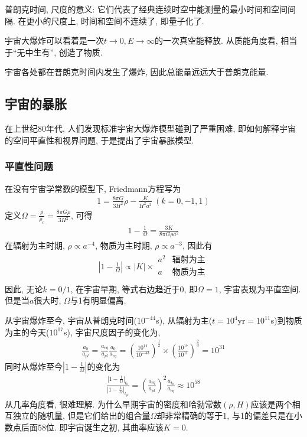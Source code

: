 普朗克时间, 尺度的意义: 它们代表了经典连续时空中能测量的最小时间和空间间隔. 在更小的尺度上, 时间和空间不连续了, 即量子化了. 

宇宙大爆炸可以看着是一次$t\rightarrow 0, E\rightarrow \infty$的一次真空能释放. 从质能角度看, 相当于``无中生有'', 创造了物质. 

宇宙各处都在普朗克时间内发生了爆炸, 因此总能量远远大于普朗克能量. 

\subsection{宇宙的暴胀}
在上世纪80年代, 人们发现标准宇宙大爆炸模型碰到了严重困难, 即如何解释宇宙的空间平直性和视界问题, 于是提出了宇宙暴胀模型. 

\subsubsection{平直性问题}
在没有宇宙学常数的模型下, Friedmann方程写为
\begin{align*}
    1=\frac{8\pi G}{3H^2}\rho-\frac{K}{H^2 a^2}\ (k=0, -1, 1)
\end{align*}
定义$\Omega=\frac{\rho}{\rho_c}=\frac{8\pi G \rho }{3H^2}$, 可得
\begin{align*}
    1-\frac{1}{\Omega}=\frac{3K}{8\pi G \rho a^2}
\end{align*}
在辐射为主时期, $\rho \propto a^{-4}$, 物质为主时期, $\rho\propto a^{-3}$, 因此有
\begin{align*}
    \left| 1-\frac{1}{\Omega} \right|\propto |K| \times \begin{array}{ll}
        a^2 &\text{辐射为主} \\
        a   &\text{物质为主} \\
    \end{array}
\end{align*}
因此, 无论$k=0/1$, 在宇宙早期, 等式右边趋近于0,  即$\Omega=1$, 宇宙表现为平直空间. 但是当$a$很大时,  $\Omega$与1有明显偏离. 

从宇宙爆炸至今, 宇宙从普朗克时间($10^{-44}$s), 从辐射为主($t=10^4$yr$=10^{11}$s)到物质为主的今天($10^17$s), 宇宙尺度因子的变化为, 
\begin{align*}
    \frac{a_0}{a_{pl}}=\frac{a_{eq}}{a_{pl}}\frac{a_0}{a_{eq}}=\left( \frac{10^{11}}{10^{-43}} \right)^{\frac{1}{2}}\times \left( \frac{10^{17}}{10^{11}} \right)^{\frac{2}{3}}=10^{31}
\end{align*}
同时从爆炸至今$\left| 1-\frac{1}{\Omega} \right|$的变化为
\begin{align*}
    \frac{\left| 1-\frac{1}{\Omega} \right|_{t_0}}{\left| 1-\frac{1}{\Omega} \right|_{t_{pl}}}=\left( \frac{a_{eq}}{a_{pl}} \right)^2\frac{a_{t_0}}{a_{eq}}\approx 10^{58}
\end{align*}
从几率角度看, 很难理解. 为什么早期宇宙的密度和哈勃常数$(\rho,H)$应该是两个相互独立的随机量, 但是它们给出的组合量$\Omega$却非常精确的等于1, 与1的偏差只是在小数点后面58位. 即宇宙诞生之初, 其曲率应该$K=0$. 

